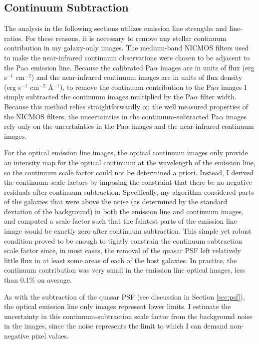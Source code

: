 \subsection{Continuum Subtraction}
\label{sec:continuum}
The analysis in the following sections utilizes emission line strengths and line-ratios. For these reasons, it is necessary to remove any stellar continuum contribution in my galaxy-only images. The medium-band NICMOS filters used to make the near-infrared continuum observations were chosen to be adjacent to the Pa$\alpha$ emission line. Because the calibrated Pa$\alpha$ images are in units of flux (erg s$^{-1}$ cm$^{-2}$) and the near-infrared continuum images are in units of flux density (erg s$^{-1}$ cm$^{-2}$ \AA$^{-1}$), to remove the continuum contribution to the Pa$\alpha$ images I simply subtracted the continuum images multiplied by the Pa$\alpha$ filter width. Because this method relies straightforwardly on the well measured properties of the NICMOS filters, the uncertainties in the continuum-subtracted Pa$\alpha$ images rely only on the uncertainties in the Pa$\alpha$ images and the near-infrared continuum images.

For the optical emission line images, the optical continuum images only provide an intensity map for the optical continuum at the wavelength of the emission line, so the continuum scale factor could not be determined a priori.  Instead, I derived the continuum scale factors by imposing the constraint that there be no negative residuals after continuum subtraction.  Specifically, my algorithm considered parts of the galaxies that were above the noise (as determined by the standard deviation of the background) in both the emission line and continuum images, and computed a scale factor such that the faintest parts of the emission line image would be exactly zero after continuum subtraction. This simple yet robust condition proved to be enough to tightly constrain the continuum subtraction scale factor since, in most cases, the removal of the quasar PSF left relatively little flux in at least some areas of each of the host galaxies.  In practice, the continuum contribution was very small in the emission line optical images, less than 0.1\% on average.

As with the subtraction of the quasar PSF (see discussion in Section \ref{sec:psf}), the optical emission line only images represent lower limits. I estimate the uncertainty in this continuum-subtraction scale factor from the background noise in the images, since the noise represents the limit to which I can demand non-negative pixel values.

